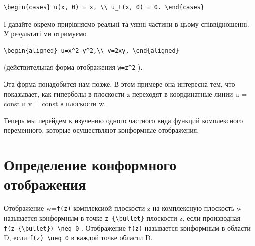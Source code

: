 \documentclass[
  ukrainian,
]{article}
\begin{document}
\begin{verbatim}
\begin{cases} u(x, 0) = x, \\ u_t(x, 0) = 0. \end{cases}
\end{verbatim}

І давайте окремо прирівняємо реальні та уявні частини в цьому
співвідношенні. У результаті ми отримуємо

\begin{verbatim}
\begin{aligned} u=x^2-y^2,\\ v=2xy, \end{aligned}
\end{verbatim}

(действительная форма отображения \texttt{w=z\^{}2} ).

Эта форма понадобится нам позже. В этом примере она интересна тем, что
показывает, как гиперболы в плоскости z переходят в координатные линии u
= const и v = const в плоскости w.

Теперь мы перейдем к изучению одного частного вида функций комплексного
переменного, которые осуществляют конформные отображения.

\section{Определение конформного
отображения}\label{ux43eux43fux440ux435ux434ux435ux43bux435ux43dux438ux435-ux43aux43eux43dux444ux43eux440ux43cux43dux43eux433ux43e-ux43eux442ux43eux431ux440ux430ux436ux435ux43dux438ux44f}

Отображение w=\texttt{f(z)} комплексиой плоскости z на комплексную
плоскость w называется конформным в точке
\texttt{z\_\{\textbackslash{}bullet\}} плоскости z, если производная
\texttt{f\textquotesingle{}(z\_\{\textbackslash{}bullet\})\ \textbackslash{}neq\ 0}
. Отображение \texttt{f(z)} называется конформным в области D, если
\texttt{f\textquotesingle{}(z)\ \textbackslash{}neq\ 0} в каждой точке
области D.
\end{document}
